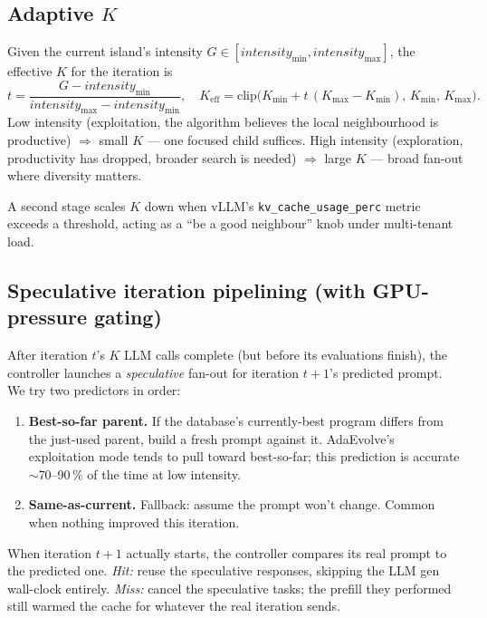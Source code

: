 \documentclass[11pt]{article}
\newcommand{\adaev}{AdaEvolve}
\begin{document}
\subsection{Adaptive $K$}
\label{sec:approach-adaptive-k}

Given the current island's intensity $G \in
[\textit{intensity}_{\min}, \textit{intensity}_{\max}]$, the
effective $K$ for the iteration is
\[
  t = \frac{G - \textit{intensity}_{\min}}
           {\textit{intensity}_{\max} - \textit{intensity}_{\min}},
  \quad
  K_\text{eff} = \mathrm{clip}\bigl(K_{\min} + t \,(K_{\max} - K_{\min}),\, K_{\min},\, K_{\max}\bigr).
\]
Low intensity (exploitation, the algorithm believes the local
neighbourhood is productive) $\Rightarrow$ small $K$ --- one focused
child suffices. High intensity (exploration, productivity has
dropped, broader search is needed) $\Rightarrow$ large $K$ ---
broad fan-out where diversity matters.

A second stage scales $K$ down when vLLM's
\verb|kv_cache_usage_perc| metric exceeds a threshold, acting as a
``be a good neighbour'' knob under multi-tenant load.

\subsection{Speculative iteration pipelining (with GPU-pressure gating)}
\label{sec:approach-spec}

After iteration $t$'s $K$ LLM calls complete (but before its
evaluations finish), the controller launches a \emph{speculative}
fan-out for iteration $t{+}1$'s predicted prompt. We try two
predictors in order:
\begin{enumerate}
  \item \textbf{Best-so-far parent.} If the database's currently-best
    program differs from the just-used parent, build a fresh prompt
    against it. \adaev{}'s exploitation mode tends to pull toward
    best-so-far; this prediction is accurate $\sim$70--90\,\% of the
    time at low intensity.
  \item \textbf{Same-as-current.} Fallback: assume the prompt won't
    change. Common when nothing improved this iteration.
\end{enumerate}

When iteration $t{+}1$ actually starts, the controller compares its
real prompt to the predicted one. \emph{Hit:} reuse the speculative
responses, skipping the LLM gen wall-clock entirely. \emph{Miss:}
cancel the speculative tasks; the prefill they performed still
warmed the cache for whatever the real iteration sends.
\end{document}
